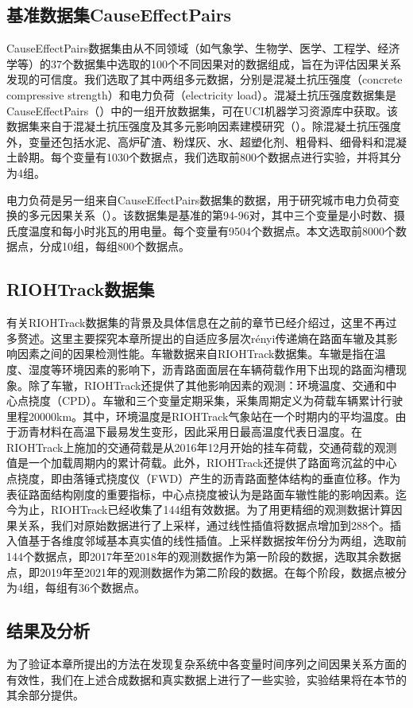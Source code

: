 \subsection{基准数据集CauseEffectPairs}
CauseEffectPairs数据集由从不同领域（如气象学、生物学、医学、工程学、经济学等）的37个数据集中选取的100个不同因果对的数据组成，旨在为评估因果关系发现的可信度。我们选取了其中两组多元数据，分别是混凝土抗压强度（concrete compressive strength）和电力负荷（electricity load）。混凝土抗压强度数据集是CauseEffectPairs（\cite{3_25}）中的一组开放数据集，可在UCI机器学习资源库中获取。该数据集来自于混凝土抗压强度及其多元影响因素建模研究（\cite{3_26}）。除混凝土抗压强度外，变量还包括水泥、高炉矿渣、粉煤灰、水、超塑化剂、粗骨料、细骨料和混凝土龄期。每个变量有1030个数据点，我们选取前800个数据点进行实验，并将其分为4组。

电力负荷是另一组来自CauseEffectPairs数据集的数据，用于研究城市电力负荷变换的多元因果关系（\cite{3_25}）。该数据集是基准的第94-96对，其中三个变量是小时数、摄氏度温度和每小时兆瓦的用电量。每个变量有9504个数据点。本文选取前8000个数据点，分成10组，每组800个数据点。
\subsection{RIOHTrack数据集}
有关RIOHTrack数据集的背景及具体信息在之前的章节已经介绍过，这里不再过多赘述。这里主要探究本章所提出的自适应多层次r\'{e}nyi传递熵在路面车辙及其影响因素之间的因果检测性能。车辙数据来自RIOHTrack数据集。车辙是指在温度、湿度等环境因素的影响下，沥青路面面层在车辆荷载作用下出现的路面沟槽现象。除了车辙，RIOHTrack还提供了其他影响因素的观测：环境温度、交通和中心点挠度（CPD）。车辙和三个变量定期采集，采集周期定义为荷载车辆累计行驶里程20000km。其中，环境温度是RIOHTrack气象站在一个时期内的平均温度。由于沥青材料在高温下最易发生变形，因此采用日最高温度代表日温度。在RIOHTrack上施加的交通荷载是从2016年12月开始的挂车荷载，交通荷载的观测值是一个加载周期内的累计荷载。此外，RIOHTrack还提供了路面弯沉盆的中心点挠度，即由落锤式挠度仪（FWD）产生的沥青路面整体结构的垂直位移。作为表征路面结构刚度的重要指标，中心点挠度被认为是路面车辙性能的影响因素。迄今为止，RIOHTrack已经收集了144组有效数据。为了用更精细的观测数据计算因果关系，我们对原始数据进行了上采样，通过线性插值将数据点增加到288个。插入值基于各维度邻域基本真实值的线性插值。上采样数据按年份分为两组，选取前144个数据点，即2017年至2018年的观测数据作为第一阶段的数据，选取其余数据点，即2019年至2021年的观测数据作为第二阶段的数据。在每个阶段，数据点被分为4组，每组有36个数据点。

\subsection{结果及分析}
为了验证本章所提出的方法在发现复杂系统中各变量时间序列之间因果关系方面的有效性，我们在上述合成数据和真实数据上进行了一些实验，实验结果将在本节的其余部分提供。

